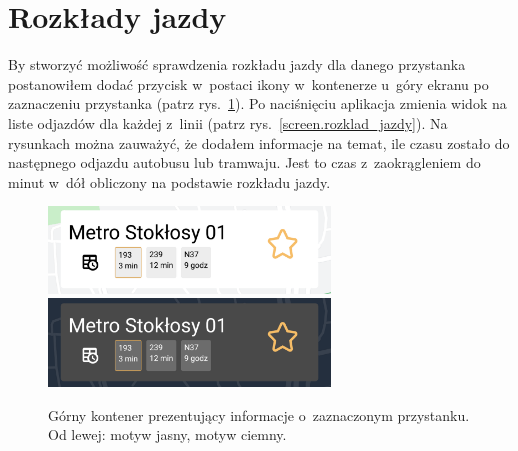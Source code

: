 \documentclass{SGGW-thesis}
\begin{document}
\section{Rozkłady jazdy}
By stworzyć możliwość sprawdzenia rozkładu jazdy dla danego przystanka postanowiłem dodać przycisk w~postaci ikony w~kontenerze u~góry ekranu po zaznaczeniu przystanka (patrz rys.~\ref{screen.topbox}).
Po naciśnięciu aplikacja zmienia widok na liste odjazdów dla każdej z~linii (patrz rys.~\ref{screen.rozklad_jazdy}).
Na rysunkach można zauważyć, że dodałem informacje na temat, ile czasu zostało do następnego odjazdu autobusu lub tramwaju.
Jest to czas z~zaokrągleniem do minut w~dół obliczony na podstawie rozkładu jazdy.
\begin{figure}[!htb]
  \centering
  \includegraphics[width=75mm]{screeny/topbox_jasny}
  \enspace
  \includegraphics[width=75mm]{screeny/topbox_ciemny}
  \caption[Górny kontener]{
    \label{screen.topbox}
    Górny kontener prezentujący informacje o~zaznaczonym przystanku. Od lewej: motyw jasny, motyw ciemny. \vspace{2ex}
  }
\end{figure}
\end{document}
